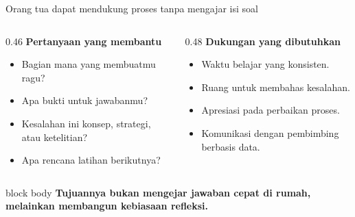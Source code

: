 \begin{frame}{Orang tua dapat mendukung proses tanpa mengajar isi soal}
  \begin{columns}[T,onlytextwidth]
    \begin{column}{0.46\textwidth}
      {\color{StudentBlue}\bfseries Pertanyaan yang membantu}\par
      \begin{itemize}
        \item Bagian mana yang membuatmu ragu?
        \item Apa bukti untuk jawabanmu?
        \item Kesalahan ini konsep, strategi, atau ketelitian?
        \item Apa rencana latihan berikutnya?
      \end{itemize}
    \end{column}
    \begin{column}{0.48\textwidth}
      {\color{StudentBlue}\bfseries Dukungan yang dibutuhkan}\par
      \begin{itemize}
        \item Waktu belajar yang konsisten.
        \item Ruang untuk membahas kesalahan.
        \item Apresiasi pada perbaikan proses.
        \item Komunikasi dengan pembimbing berbasis data.
      \end{itemize}
    \end{column}
  \end{columns}
  \vspace{0.15cm}
  \begin{beamercolorbox}[rounded=true,sep=0.18cm,wd=\textwidth]{block body}
    \centering\bfseries Tujuannya bukan mengejar jawaban cepat di rumah, melainkan membangun kebiasaan refleksi.
  \end{beamercolorbox}
\end{frame}

